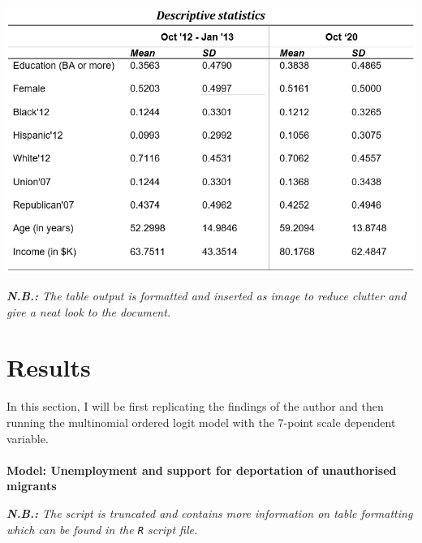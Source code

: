 \documentclass[12pt,letterpaper]{article}
\begin{document}
\begin{center}
	\includegraphics{Descriptive Stats.png}  
\end{center}
\textit{\textbf{N.B.:} The table output is formatted and inserted as image to reduce clutter and give a neat look to the document.}

\vspace*{.2cm}

\pagebreak
\section*{Results}
In this section, I will be first replicating the findings of the author and then running the multinomial ordered logit model with the 7-point scale dependent variable.\\
\\\textbf{Model: Unemployment and support for deportation of unauthorised migrants}

\textit{\textbf{N.B.:} The script is truncated and contains more information on table formatting which can be found in the \texttt{R} script file.}
\end{document}
